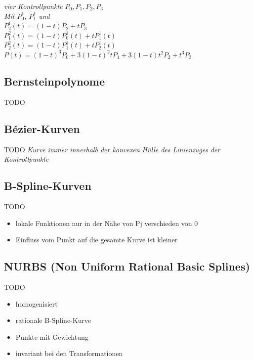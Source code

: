 \textit{vier Kontrollpunkte $P_0, P_1, P_2, P_3$}\\

\textit{Mit $P_0^1$, $P_1^1$ und} \\
$P_2^1(t) = (1-t)P_2 + tP_3$ \\

$P_1^2(t) = (1 - t) P_0^1(t) + tP_1^1(t)$ \\
$P_2^2(t) = (1 - t) P_1^1(t) + tP_2^1(t)$ \\

$P(t) = (1 - t)^3P_0 + 3(1 - t)^2tP_1 + 3(1 - t)t^2P_2 + t^3P_3$

\subsection{Bernsteinpolynome}
TODO

\subsection{Bézier-Kurven}
TODO
\textit{Kurve immer innerhalb der konvexen Hülle des Linienzuges der Kontrollpunkte}

\subsection{B-Spline-Kurven}
TODO
\begin{itemize}
	\item lokale Funktionen nur in der Nähe von Pj verschieden von 0 
	\item Einfluss vom Punkt auf die gesamte Kurve ist kleiner
\end{itemize}

\subsection{NURBS (Non Uniform Rational Basic Splines)}
TODO
\begin{itemize}
	\item homogenisiert
	\item rationale B-Spline-Kurve
	\item Punkte mit Gewichtung
	\item invariant bei den Transformationen
\end{itemize}